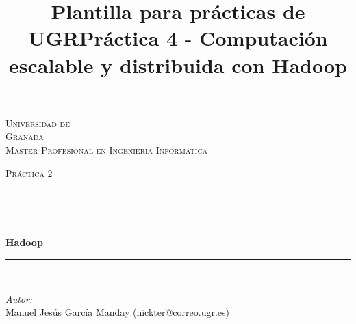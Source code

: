 \documentclass[10pt]{article}
\title{Plantilla para prácticas de UGR}
\title{Práctica 4 - Computación escalable y distribuida con Hadoop}
\begin{document}
\begin{center}																		%
\newcommand{\HRule}{\rule{\linewidth}{0.5mm}}									%
\begin{minipage}{0.48\textwidth} \begin{flushleft}
\end{flushleft}\end{minipage}
\begin{minipage}{0.48\textwidth} \begin{flushright}
\end{flushright}\end{minipage}

\vspace*{-1.5cm}								%
\textsc{\huge Universidad de\\ \vspace{5px} Granada}\\[1.5cm]	

\textsc{\LARGE Master Profesional en Ingenier\'ia Inform\'atica }\\[1.5cm]													%

\begin{minipage}{0.9\textwidth} 
\begin{center}																					%
\textsc{\LARGE Pr\'actica 2}
\end{center}
\end{minipage}\\[0.5cm]
 			\vspace*{1cm}																		%
\HRule \\[0.4cm]																	%
{ \huge \bfseries Hadoop}\\[0.4cm]	%
\HRule \\[1.5cm]																	%
\begin{minipage}{0.46\textwidth}													%
\begin{flushleft} \large															%
\emph{Autor:}\\	
Manuel Jes\'us Garc\'ia Manday (nickter@correo.ugr.es)\\
\end{flushleft}																		%
\end{minipage}		
\begin{minipage}{0.52\textwidth}		
\vspace{-0.6cm}											%
\begin{flushright} \large															%
\end{flushright}																	%
\end{minipage}	
\vspace*{1cm}
 	

\end{center}
\end{document}
